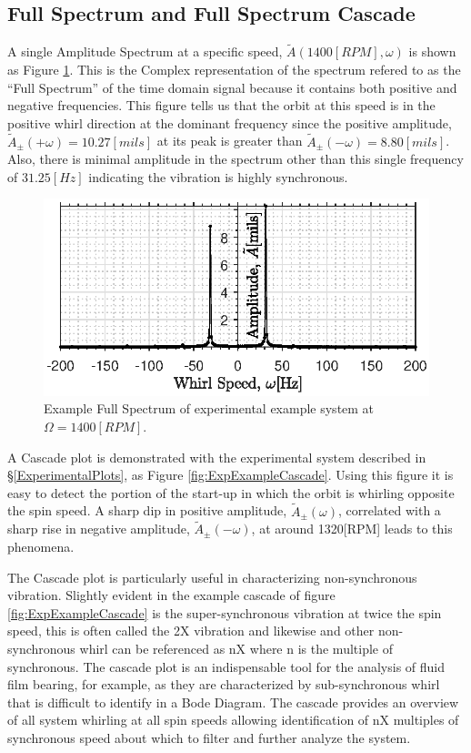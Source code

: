 \subsection{Full Spectrum and Full Spectrum Cascade}
A single Amplitude Spectrum at a specific speed, $ \tilde{A}(1400[RPM],\omega) $ is shown as Figure \ref{fig:ExpExampleSpectrum}. This is the Complex representation of the spectrum refered to as the ``Full Spectrum'' of the time domain signal because it contains both positive and negative frequencies. This figure tells us that the orbit at this speed is in the positive whirl direction at the dominant frequency since the positive amplitude, $ \tilde{A}_\pm(+\omega)=10.27[mils] $ at its peak is greater than $ \tilde{A}_\pm(-\omega)=8.80[mils] $. Also, there is minimal amplitude in the spectrum other than this single frequency of $ 31.25[Hz] $ indicating the vibration is highly synchronous.\par
\begin{figure}
	\centering
	\includegraphics[]{./figures/ExpExampleSpectrum.eps}
	\caption{Example Full Spectrum of experimental example system at $ \Omega=1400[RPM] $.}
	\label{fig:ExpExampleSpectrum}
\end{figure}
 A Cascade plot is demonstrated with the experimental system described in \S\ref{ExperimentalPlots}, as Figure \ref{fig:ExpExampleCascade}. Using this figure it is easy to detect the portion of the start-up in which the orbit is whirling opposite the spin speed. A sharp dip in positive amplitude, $ \tilde{A}_\pm(\omega) $, correlated with a sharp rise in negative amplitude, $ \tilde{A}_\pm(-\omega) $, at around 1320[RPM] leads to this phenomena.\par 
The Cascade plot is particularly useful in characterizing non-synchronous vibration. Slightly evident in the example cascade of figure \ref{fig:ExpExampleCascade} is the super-synchronous vibration at twice the spin speed, this is often called the 2X vibration and likewise and other non-synchronous whirl can be referenced as nX where n is the multiple of synchronous. The cascade plot is an indispensable tool for the analysis of fluid film bearing, for example, as they are characterized by sub-synchronous whirl that is difficult to identify in a Bode Diagram. The cascade provides an overview of all system whirling at all spin speeds allowing identification of nX multiples of synchronous speed about which to filter and further analyze the system.\par 
